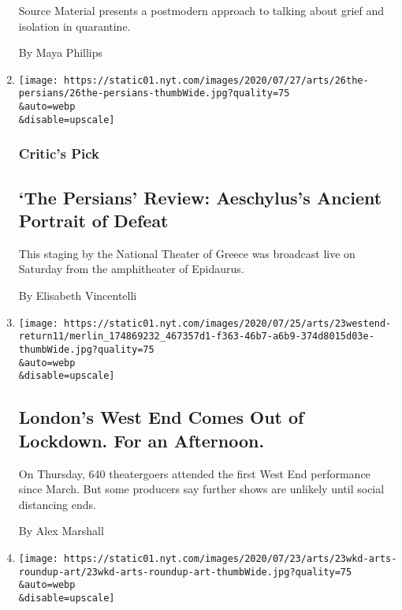 \begin{enumerate}
  Source Material presents a postmodern approach to talking about grief
  and isolation in quarantine.

  By Maya Phillips
\item
  \href{/2020/07/26/theater/the-persians-review-aeschylus.html}{}

  \texttt{[image: https://static01.nyt.com/images/2020/07/27/arts/26the-persians/26the-persians-thumbWide.jpg?quality=75\\\&auto=webp\\\&disable=upscale]}

  \hypertarget{critics-pick-1}{%
  \subsubsection{Critic's Pick}\label{critics-pick-1}}

  \hypertarget{the-persians-review-aeschyluss-ancient-portrait-of-defeat}{%
  \subsection{`The Persians' Review: Aeschylus's Ancient Portrait of
  Defeat}\label{the-persians-review-aeschyluss-ancient-portrait-of-defeat}}

  This staging by the National Theater of Greece was broadcast live on
  Saturday from the amphitheater of Epidaurus.

  By Elisabeth Vincentelli
\item
  \href{/2020/07/23/theater/west-end-london-virus.html}{}

  \texttt{[image: https://static01.nyt.com/images/2020/07/25/arts/23westend-return11/merlin\_174869232\_467357d1-f363-46b7-a6b9-374d8015d03e-thumbWide.jpg?quality=75\\\&auto=webp\\\&disable=upscale]}

  \hypertarget{londons-west-end-comes-out-of-lockdown-for-an-afternoon}{%
  \subsection{London's West End Comes Out of Lockdown. For an
  Afternoon.}\label{londons-west-end-comes-out-of-lockdown-for-an-afternoon}}

  On Thursday, 640 theatergoers attended the first West End performance
  since March. But some producers say further shows are unlikely until
  social distancing ends.

  By Alex Marshall
\item
  \href{/2020/07/23/arts/things-to-do-weekend-coronavirus.html}{}

  \texttt{[image: https://static01.nyt.com/images/2020/07/23/arts/23wkd-arts-roundup-art/23wkd-arts-roundup-art-thumbWide.jpg?quality=75\\\&auto=webp\\\&disable=upscale]}


\end{enumerate}
